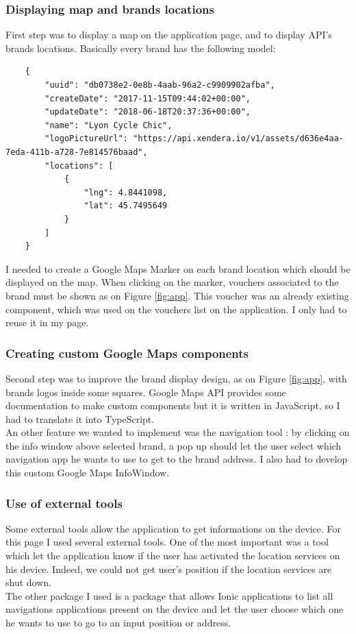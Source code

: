 \documentclass{article}
\begin{document}
                \subsubsection{Displaying map and brands locations}
                    First step was to display a map on the application page, and to display API's brands locations. Basically every brand has the following model:
                    \begin{lstlisting}
    {
        "uuid": "db0738e2-0e8b-4aab-96a2-c9909902afba",
        "createDate": "2017-11-15T09:44:02+00:00",
        "updateDate": "2018-06-18T20:37:36+00:00",
        "name": "Lyon Cycle Chic",
        "logoPictureUrl": "https://api.xendera.io/v1/assets/d636e4aa-7eda-411b-a728-7e814576baad",
        "locations": [
            {
                "lng": 4.8441098,
                "lat": 45.7495649
            }
        ]
    }
                    \end{lstlisting}
                    I needed to create a Google Maps Marker on each brand location which should be displayed on the map. When clicking on the marker,
                    vouchers associated to the brand must be shown as on Figure \ref{fig:app}. This voucher was an already existing component, which was
                    used on the vouchers list on the application. I only had to reuse it in my page.

                \subsubsection{Creating custom Google Maps components}
                    Second step was to improve the brand display design, as on Figure \ref{fig:app}, with brands logos inside some squares. Google Maps API
                    provides some documentation to make custom components but it is written in JavaScript, so I had to translate it into TypeScript.\\
                    An other feature we wanted to implement was the navigation tool : by clicking on the info window above selected brand, a pop up should
                    let the user select which navigation app he wants to use to get to the brand address. I also had to develop this custom Google Maps InfoWindow.

                \subsubsection{Use of external tools}
                    Some external tools allow the application to get informations on the device.
                    For this page I used several external tools. One of the most important was a tool which let the application know if the user has activated
                    the location services on his device. Indeed, we could not get user's position if the location services are shut down.
                    \\
                    The other package I used is a package that allows Ionic applications to list all navigations applications present on the device and let 
                    the user choose which one he wants to use to go to an input position or address.
                    
\end{document}
